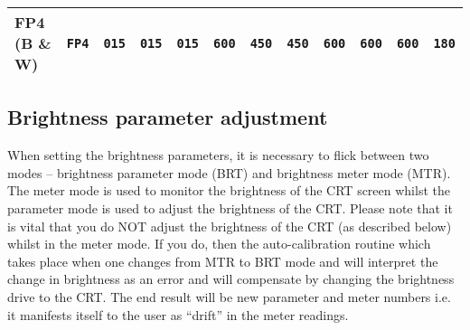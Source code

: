 \begin{table}[htb]
\begin{center}
\begin{tabular}{|l|l|c|c|c|c|c|c|c|c|c|c|}
% 
% 
% 
{FP4 (B \& W)} & {\tt FP4} & {\tt 015}  & {\tt 015} & {\tt 015}  
& {\tt 600} & {\tt 450} & {\tt 450} & {\tt 600} & {\tt 600} & {\tt 600} & 
{\tt 180} \\
\hline
\end {tabular}
\end {center}
\end {table}

\subsection {\bf Brightness parameter adjustment}

When setting the brightness parameters, it is necessary to flick between two
modes -- brightness parameter mode (BRT) and brightness meter mode (MTR). The
meter mode is used to monitor the brightness of the CRT screen whilst the
parameter mode is used to adjust the brightness of the CRT. Please note that it
is vital that you do NOT adjust the brightness of the CRT (as described below)
whilst in the meter mode. If you do, then the auto-calibration routine which
takes place when one changes from MTR to BRT mode and will interpret the
change in brightness as an error and will compensate by changing the brightness
drive to the CRT. The end result will be new parameter and meter numbers 
i.e. it manifests itself to the user as ``drift'' in the meter readings.

